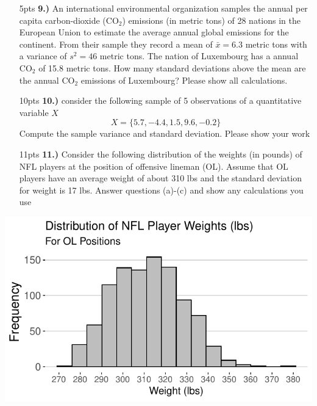 \documentclass[
]{article}
\begin{document}
\newpage
\begin{enumerate}
\item[5pts \bf 9.)]{An international environmental organization samples the annual per capita carbon-dioxide ($\text{CO}_2$) emissions (in metric tons) of 28 nations in the European Union to estimate the average annual global emissions for the continent. From their sample they record a mean of $\bar{x} = 6.3$ metric tons with a variance of $s^2 = 46$ metric tons. The nation of Luxembourg has a annual $\text{CO}_2$ of 15.8 metric tons. How many standard deviations above the mean are the annual $\text{CO}_2$ emissions of Luxembourg? Please show all calculations.}
\item[]
\item[]
\item[]
\item[]
\item[]
\item[]
\item[]
\end{enumerate}

\begin{enumerate}
\item[10pts \bf 10.)]{consider the following sample of 5 observations of a quantitative variable $X$ 
\[ X = \{5.7, -4.4, 1.5, 9.6, -0.2 \}\]
Compute the sample variance and standard deviation. Please show your work}
\item[]
\item[]
\item[]
\item[]
\item[]
\item[]
\item[]
\item[]
\item[]
\item[]
\end{enumerate}

\newpage
\begin{enumerate}
\item[11pts \bf 11.)]{Consider the following distribution of the weights (in pounds) of NFL players at the position of offensive lineman (OL). Assume that OL players have an average weight of about 310 lbs and the standard deviation for weight is 17 lbs. Answer questions (a)-(c) and show any calculations you use}
\end{enumerate}

\includegraphics{Exam_1_Version_A_files/figure-latex/unnamed-chunk-2-1.pdf}
\end{document}
